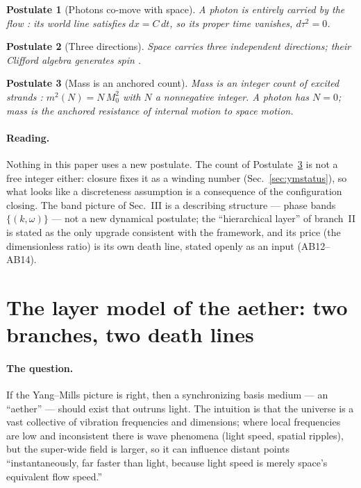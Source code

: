 \documentclass[aps,prd,preprint,superscriptaddress,amsmath,amssymb]{revtex4-2}
\newtheorem{postulate}{Postulate}[section]
\begin{document}
\begin{postulate}[Photons co-move with space]
\label{post:photon}
A photon is entirely carried by the flow \cite{maxwell1996dynamical,gordon1923lichtfortpflanzung}:
its world line satisfies $dx=C\,dt$, so its proper time vanishes, $d\tau^2=0$.
\end{postulate}

\begin{postulate}[Three directions]
\label{post:three}
Space carries three independent directions; their Clifford algebra
generates spin \cite{pauli1925zusammenhang,dirac1928quantum,heisenberg1927anschaulichen}.
\end{postulate}

\begin{postulate}[Mass is an anchored count]
\label{post:mass}
Mass is an integer count of excited strands \cite{planck1978gesetz,einstein1905erzeugung,de1924recherches}:
$m^2(N)=N\,M_0^2$ with $N$ a nonnegative integer.  A photon has
$N=0$; mass is the anchored resistance of internal motion to space
motion.
\end{postulate}

\paragraph{Reading.}
Nothing in this paper uses a new postulate.  The count of
Postulate~\ref{post:mass} is not a free integer either: closure fixes it
as a winding number (Sec.~\ref{sec:ymstatus}), so what looks like a
discreteness assumption is a consequence of the configuration closing.
The band picture of
Sec.~III is a describing structure --- phase bands $\{(k,\omega)\}$
--- not a new dynamical postulate; the ``hierarchical layer'' of
branch~II is stated as the only upgrade consistent with the
framework, and its price (the dimensionless ratio) is its own death
line, stated openly as an input (AB12--AB14).

\section{The layer model of the aether: two branches, two death lines}
\label{sec:aether}

\paragraph{The question.}
If the Yang--Mills picture is right, then a synchronizing basis medium
--- an ``aether'' --- should exist that outruns light.  The intuition
is that the universe is a vast collective of vibration frequencies and
dimensions; where local frequencies are low and inconsistent there is
wave phenomena (light speed, spatial ripples), but the super-wide
field is larger, so it can influence distant points ``instantaneously,
far faster than light, because light speed is merely space's equivalent
flow speed.''
\end{document}
